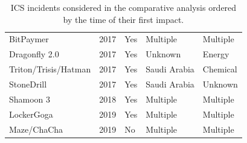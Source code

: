 \documentclass[runningheads]{llncs}
\begin{document}
\begin{table}[h]
\begin{tabular}{|l|l|l|l|l|}
    BitPaymer                       & 2017                                       & Yes                                    & Multiple                                     & Multiple                             \\
    Dragonfly 2.0                   & 2017                                       & Yes                                    & Unknown                                            & Energy                               \\
    Triton/Trisis/Hatman            & 2017                                       & Yes                                    & Saudi Arabia                                 & Chemical                  \\
    StoneDrill                      & 2017                                       & Yes                                    & Saudi Arabia                                 & Unknown                                    \\
    Shamoon 3                       & 2018                                       & Yes                                    & Multiple                                     & Multiple                             \\
    LockerGoga                      & 2019                                       & Yes                                    & Multiple                                     & Multiple                             \\
    Maze/ChaCha                     & 2019                                       & No                                     & Multiple                                     & Multiple\\
    \hline
    \end{tabular}
    \medskip\medskip
    \caption{ICS incidents considered in the comparative analysis ordered by the time of their first impact.}
    \label{tab:incidents}
    \end{table}
\end{document}
